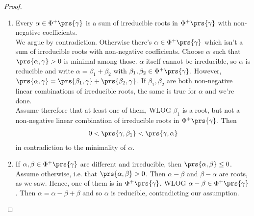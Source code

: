 \documentclass[10pt,a4paper,twoside,openany,hidelinks]{book}
\begin{document}
\begin{proof}
\begin{enumerate}[label = \Roman*.]
\item Every $\alpha \in \Phi^+\prs{\gamma}$ is a sum of irreducible roots in $\Phi^+\prs{\gamma}$ with non-negative coefficients.\\
We argue by contradiction. Otherwise there's $\alpha \in \Phi^+\prs{\gamma}$ which isn't a sum of irreducible roots with non-negative coefficients. Choose $\alpha$ such that $\prs{\alpha,\gamma} > 0$ is minimal among those.
$\alpha$ itself cannot be irreducible, so $\alpha$ is reducible and write $\alpha = \beta_1 + \beta_2$ with $\beta_1,\beta_2 \in \Phi^+\prs{\gamma}$.
However,
$\prs{\alpha,\gamma} = \prs{\beta_1,\gamma} + \prs{\beta_2, \gamma}$.
If $\beta_1, \beta_2$ are both non-negative linear combinations of irreducible roots, the same is true for $\alpha$ and we're done.\\
Assume therefore that at least one of them, WLOG $\beta_1$ is a root, but not a non-negative linear combination of irreducible roots in $\Phi^+\prs{\gamma}$. Then
\[0 < \prs{\gamma,\beta_1} < \prs{\gamma,\alpha}\]
in contradiction to the minimality of $\alpha$.

\item If $\alpha, \beta \in \Phi^+\prs{\gamma}$ are different and irreducible, then $\prs{\alpha,\beta} \leq 0$.\\
Assume otherwise, i.e. that $\prs{\alpha,\beta} > 0$. Then $\alpha - \beta$ and $\beta - \alpha$ are roots, as we saw.
Hence, one of them is in $\Phi^+\prs{\gamma}$. WLOG $\alpha - \beta \in \Phi^+\prs{\gamma}$. Then $\alpha = \alpha - \beta + \beta$ and so $\alpha$ is reducible, contradicting our assumption.


\end{enumerate}
\end{proof}
\end{document}
